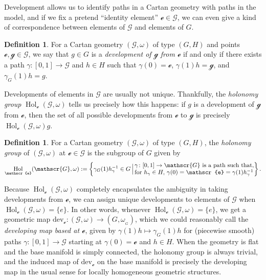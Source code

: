 \documentclass[10pt,a4paper]{amsart}
\numberwithin{equation}{section}
\theoremstyle{definition}
\newtheorem{Definition}[Theorem]{Definition}
\DeclareMathOperator{\Hol}{\mathrm{Hol}}
\newcommand{\MC}[1]{\omega_{{}_{#1}}}
\begin{document}
Development allows us to identify paths in a Cartan geometry with paths in the model, and if we fix a pretend ``identity element'' $\mathscr{e}\in\mathscr{G}$, we can even give a kind of correspondence between elements of $\mathscr{G}$ and elements of $G$.

\begin{Definition}For a Cartan geometry $(\mathscr{G},\omega)$ of type $(G,H)$ and points $\mathscr{e},\mathscr{g}\in\mathscr{G}$, we say that $g\in G$ is a \emph{development of $\mathscr{g}$ from $\mathscr{e}$} if and only if there exists a path $\gamma\colon [0,1]\to\mathscr{G}$ and $h\in H$ such that $\gamma(0)=\mathscr{e}$, $\gamma(1)h=\mathscr{g}$, and $\gamma_G(1)h=g$.\end{Definition}

Developments of elements in $\mathscr{G}$ are usually not unique. Thankfully, the \emph{holonomy group} $\Hol_\mathscr{e}(\mathscr{G},\omega)$ tells us precisely how this happens: if $g$ is a development of $\mathscr{g}$ from $\mathscr{e}$, then the set of all possible developments from $\mathscr{e}$ to $\mathscr{g}$ is precisely $\Hol_\mathscr{e}(\mathscr{G},\omega)g$.

\begin{Definition}For a Cartan geometry $(\mathscr{G},\omega)$ of type $(G,H)$, the \emph{holonomy group} of $(\mathscr{G},\omega)$ at $\mathscr{e}\in\mathscr{G}$ is the subgroup of $G$ given by \[\Hol_\mathscr{e}(\mathscr{G},\omega):=\left\{\gamma_G(1)h_\gamma^{-1}\in G \,\Big|\, \begin{array}{@{}l@{}}\gamma\colon [0,1]\to\mathscr{G}\text{ is a path such that,} \\ \text{for }h_\gamma\in H,\,\gamma(0)=\mathscr{e}=\gamma(1)h_\gamma^{-1}\end{array}\right\}.\]
\end{Definition}

Because $\Hol_\mathscr{e}(\mathscr{G},\omega)$ completely encapsulates the ambiguity in taking developments from $\mathscr{e}$, we can assign unique developments to elements of $\mathscr{G}$ when $\Hol_\mathscr{e}(\mathscr{G},\omega)=\{e\}$. In other words, whenever $\Hol_\mathscr{e}(\mathscr{G},\omega)=\{e\}$, we get a geometric map $\mathrm{dev}_\mathscr{e}\colon (\mathscr{G},\omega)\to (G,\MC{G})$, which we could reasonably call the \emph{developing map based at $\mathscr{e}$}, given by $\gamma(1)h\mapsto\gamma_G(1)h$ for (piecewise smooth) paths $\gamma \colon [0,1]\to\mathscr{G}$ starting at $\gamma(0)=\mathscr{e}$ and $h\in H$. When the geometry is flat and the base manifold is simply connected, the holonomy group is always trivial, and the induced map of $\mathrm{dev}_\mathscr{e}$ on the base manifold is precisely the developing map in the usual sense for locally homogeneous geometric structures.
\end{document}
